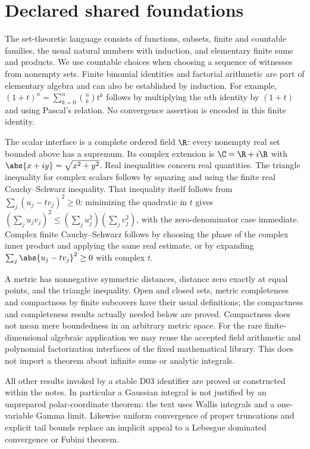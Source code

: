 \chapter*{Declared shared foundations}
\label{shared-foundations}
The set-theoretic language consists of functions, subsets, finite and countable
families, the usual natural numbers with induction, and elementary finite sums
and products. We use countable choices when choosing a sequence of witnesses
from nonempty sets. Finite binomial identities and factorial arithmetic are part
of elementary algebra and can also be established by induction. For example,
$(1+t)^n=\sum_{k=0}^n\binom nk t^k$ follows by multiplying the $n$th identity by
$(1+t)$ and using Pascal's relation. No convergence assertion is encoded in this
finite identity.

The scalar interface is a complete ordered field $\R$: every nonempty real set
bounded above has a supremum. Its complex extension is $\C=\R+i\R$ with
$\abs{x+iy}=\sqrt{x^2+y^2}$. Real inequalities concern real quantities. The
triangle inequality for complex scalars follows by squaring and using the finite
real Cauchy--Schwarz inequality. That inequality itself follows from
$\sum_j(u_j-tv_j)^2\geq0$: minimizing the quadratic in $t$ gives
$(\sum_j u_jv_j)^2\leq(\sum_j u_j^2)(\sum_jv_j^2)$, with the zero-denominator
case immediate. Complex finite Cauchy--Schwarz follows by choosing the phase of
the complex inner product and applying the same real estimate, or by expanding
$\sum_j\abs{u_j-tv_j}^2\geq0$ with complex $t$.

A metric has nonnegative symmetric distances, distance zero exactly at equal
points, and the triangle inequality. Open and closed sets, metric completeness
and compactness by finite subcovers have their usual definitions; the compactness
and completeness results actually needed below are proved. Compactness does not
mean mere boundedness in an arbitrary metric space. For the rare finite-dimensional
algebraic application we may reuse the accepted field arithmetic and polynomial
factorization interfaces of the fixed mathematical library. This does not import
a theorem about infinite sums or analytic integrals.

All other results invoked by a stable D03 identifier are proved or constructed
within the notes. In particular a Gaussian integral is not justified by an
unprepared polar-coordinate theorem: the text uses Wallis integrals and a
one-variable Gamma limit. Likewise uniform convergence of proper truncations
and explicit tail bounds replace an implicit appeal to a Lebesgue dominated
convergence or Fubini theorem.

